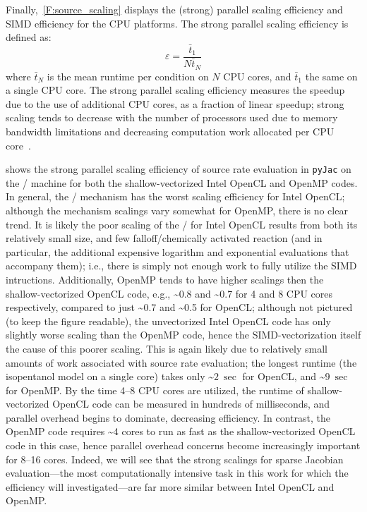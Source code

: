 \documentclass[12pt,number,sort&compress,preprint]{elsarticle}
\begin{document}
Finally,~\cref{F:source_scaling} displays the (strong) parallel scaling efficiency and SIMD efficiency for the CPU platforms.
The strong parallel scaling efficiency is defined as:
\begin{equation}
 \label{e:strong_scaling}
 \varepsilon = \frac{\bar{t}_{1}}{N \bar{t}_{N}}
\end{equation}
where $\bar{t}_{N}$ is the mean runtime per condition on $N$ CPU cores, and $\bar{t}_{1}$ the same on a single CPU core.
The strong parallel scaling efficiency measures the speedup due to the use of additional CPU cores, as a fraction of linear speedup; strong scaling tends to decrease with the number of processors used due to memory bandwidth limitations and decreasing computation work allocated per CPU core~\cite{strong_scaling}.

 shows the strong parallel scaling efficiency of source rate evaluation in \texttt{pyJac} on the \avx/ machine for both the shallow-vectorized Intel OpenCL and OpenMP codes.
In general, the \slash{} mechanism has the worst scaling efficiency for Intel OpenCL; although the mechanism scalings vary somewhat for OpenMP, there is no clear trend.
It is likely the poor scaling of the \slash{} for Intel OpenCL results from both its relatively small size, and few falloff\slash chemically activated reaction (and in particular, the additional expensive logarithm and exponential evaluations that accompany them); i.e., there is simply not enough work to fully utilize the SIMD intructions.
Additionally, OpenMP tends to have higher scalings then the shallow-vectorized OpenCL code, e.g., \textasciitilde\num{0.8} and \textasciitilde\num{0.7} for \num{4} and \num{8} CPU cores respectively, compared to just \textasciitilde\num{0.7} and \textasciitilde\num{0.5} for OpenCL; although not pictured (to keep the figure readable), the unvectorized Intel OpenCL code has only slightly worse scaling than the OpenMP code, hence the SIMD-vectorization itself the cause of this poorer scaling.
This is again likely due to relatively small amounts of work associated with source rate evaluation; the longest runtime (the isopentanol model on a single core) takes only \textasciitilde$\SI{2}{\sec}$ for OpenCL, and \textasciitilde$\SI{9}{\sec}$ for OpenMP.
By the time 4--8 CPU cores are utilized, the runtime of shallow-vectorized OpenCL code can be measured in hundreds of milliseconds, and parallel overhead begins to dominate, decreasing efficiency.
In contrast, the OpenMP code requires \textasciitilde\num{4} cores to run as fast as the shallow-vectorized OpenCL code in this case, hence parallel overhead concerns become increasingly important for 8--16 cores.
Indeed, we will see that the strong scalings for sparse Jacobian evaluation---the most computationally intensive task in this work for which the efficiency will investigated---are far more similar between Intel OpenCL and OpenMP.
\end{document}
